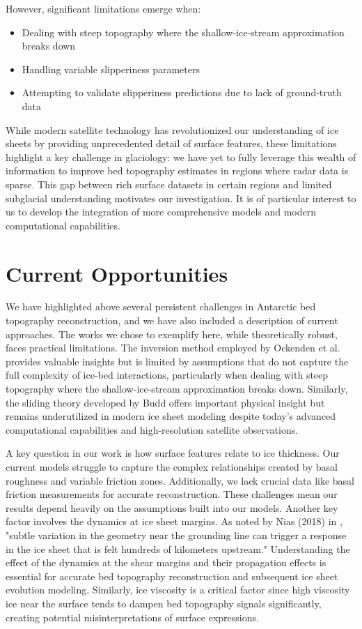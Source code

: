 However, significant limitations emerge when:
\begin{itemize}
    \item Dealing with steep topography where the shallow-ice-stream approximation breaks down
    \item Handling variable slipperiness parameters
    \item Attempting to validate slipperiness predictions due to lack of ground-truth data
\end{itemize}

While modern satellite technology has revolutionized our understanding of ice sheets by providing unprecedented detail of surface features, these limitations highlight a key challenge in glaciology: we have yet to fully leverage this wealth of information to improve bed topography estimates in regions where radar data is sparse. This gap between rich surface datasets in certain regions and limited subglacial understanding motivates our investigation. It is of particular interest to us to develop the integration of more comprehensive models and modern computational capabilities.


\section{Current Opportunities}

We have highlighted above several persistent challenges in Antarctic bed topography reconstruction, and we have also included a description of current approaches. The works we chose to exemplify here, while theoretically robust, faces practical limitations. The inversion method employed by Ockenden et al. provides valuable insights but is limited by assumptions that do not capture the full complexity of ice-bed interactions, particularly when dealing with steep topography where the shallow-ice-stream approximation breaks down. Similarly, the sliding theory developed by Budd offers important physical insight but remains underutilized in modern ice sheet modeling despite today's advanced computational capabilities and high-resolution satellite observations.

A key question in our work is how surface features relate to ice thickness. Our current models struggle to capture the complex relationships created by basal roughness and variable friction zones. Additionally, we lack crucial data like basal friction measurements for accurate reconstruction. These challenges mean our results depend heavily on the assumptions built into our models. Another key factor involves the dynamics at ice sheet margins. As noted by Nias (2018) in \cite{Nias_2018}, "subtle variation in the geometry near the grounding line can trigger a response in the ice sheet that is felt hundreds of kilometers upstream." Understanding the effect of the dynamics at the shear margins and their propagation effects is essential for accurate bed topography reconstruction and subsequent ice sheet evolution modeling. Similarly, ice viscosity is a critical factor since high viscosity ice near the surface tends to dampen bed topography signals significantly\cite{deRydt_2013}, creating potential misinterpretations of surface expressions. 

